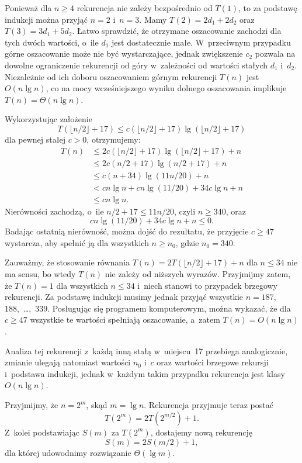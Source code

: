 Ponieważ dla $n\ge4$ rekurencja nie zależy bezpośrednio od $T(1)$, to za podstawę indukcji można przyjąć $n=2$ i~$n=3$. Mamy $T(2)=2d_1+2d_2$ oraz $T(3)=3d_1+5d_2$. Łatwo sprawdzić, że otrzymane oszacowanie zachodzi dla tych dwóch wartości, o~ile $d_1$ jest dostatecznie małe. W~przeciwnym przypadku górne oszacowanie może nie być wystarczające, jednak zwiększenie $c_2$ pozwala na dowolne ograniczenie rekurencji od góry w~zależności od wartości stałych $d_1$ i~$d_2$. Niezależnie od ich doboru oszacowaniem górnym rekurencji $T(n)$ jest $O(n\lg n)$, co na mocy wcześniejszego wyniku dolnego oszacowania implikuje $T(n)=\Theta(n\lg n)$.

\exercise %
Wykorzystując założenie
\[
	T(\lfloor n/2\rfloor+17) \le c(\lfloor n/2\rfloor+17)\lg(\lfloor n/2\rfloor+17)
\]
dla pewnej stałej $c>0$, otrzymujemy:
\begin{align*}
	T(n) &\le 2c(\lfloor n/2\rfloor+17)\lg(\lfloor n/2\rfloor+17)+n \\
	&\le 2c(n/2+17)\lg(n/2+17)+n \\
	&\le c(n+34)\lg(11n/20)+n \\
	&< cn\lg n+cn\lg(11/20)+34c\lg n+n \\
	&\le cn\lg n.
\end{align*}
Nierówności zachodzą, o~ile $n/2+17\le 11n/20$, czyli $n\ge340$, oraz
\[
	cn\lg(11/20)+34c\lg n+n \le 0.
\]
Badając ostatnią nierówność, można dojść do rezultatu, że przyjęcie $c\ge47$ wystarcza, aby spełnić ją dla wszystkich $n\ge n_0$, gdzie $n_0=340$.

Zauważmy, że stosowanie równania $T(n)=2T(\lfloor n/2\rfloor+17)+n$ dla $n\le34$ nie ma sensu, bo wtedy $T(n)$ nie zależy od niższych wyrazów. Przyjmijmy zatem, że $T(n)=1$ dla wszystkich $n\le34$ i~niech stanowi to przypadek brzegowy rekurencji. Za podstawę indukcji musimy jednak przyjąć wszystkie $n=187$, 188,~\dots,~339. Posługując się programem komputerowym, można wykazać, że dla $c\ge47$ wszystkie te wartości spełniają oszacowanie, a~zatem $T(n)=O(n\lg n)$.

Analiza tej rekurencji z~każdą inną stałą w~miejscu~17 przebiega analogicznie, zmianie ulegają natomiast wartości $n_0$ i~$c$ oraz wartości brzegowe rekursji i~podstawa indukcji, jednak w~każdym takim przypadku rekurencja jest klasy $O(n\lg n)$.

\exercise %
Przyjmijmy, że $n=2^m$, skąd $m=\lg n$. Rekurencja przyjmuje teraz postać
\[
	T(2^m) = 2T(2^{m/2})+1.
\]
Z~kolei podstawiając $S(m)$ za $T(2^m)$, dostajemy nową rekurencję
\[
	S(m) = 2S(m/2)+1,
\]
dla której udowodnimy rozwiązanie $\Theta(\lg m)$.

